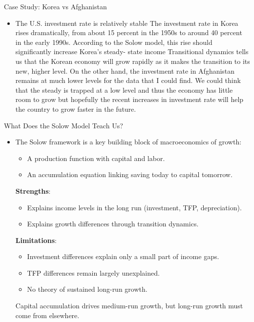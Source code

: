 \documentclass[10pt,aspectratio=169]{beamer}
\begin{document}
\begin{frame}{Case Study: Korea vs Afghanistan}
\begin{itemize}
\item  The U.S. investment rate is relatively stable
\itemvso The investment rate in Korea rises dramatically, from about 15 percent in the 1950s to around 40 percent in
the early 1990s.
\itemvso According to the Solow model, this rise should significantly increase
Korea’s steady- state income
\itemvso Transitional dynamics tells us that
the Korean economy will grow rapidly as it makes the transition to its new, higher
level.
\itemvso On the other hand, the investment rate in Afghanistan remains at much lower levels for the data that I could find.
\itemvso We could think that the steady is trapped at a low level and thus the economy has little room to grow but hopefully the recent increases in investment rate will help the country to grow faster in the future.
\end{itemize}
\end{frame}
\begin{frame}{What Does the Solow Model Teach Us?}
\begin{itemize}
\item The Solow framework is a key building block of macroeconomics of growth:
\begin{itemize}
    \item A production function with capital and labor.
    \item An accumulation equation linking saving today to capital tomorrow.
\end{itemize}
\itemvso \textbf{Strengths}:
\begin{itemize}
    \item Explains income levels in the long run (investment, TFP, depreciation).
    \item Explains growth differences through transition dynamics.
\end{itemize}
\itemvso \textbf{Limitations}:
\begin{itemize}
    \item Investment differences explain only a small part of income gaps.
    \item TFP differences remain largely unexplained.
    \item No theory of sustained long-run growth.
\end{itemize}
\itemvso Capital accumulation drives medium-run growth, but long-run growth must come from elsewhere.
\end{itemize}
\end{frame}
\end{document}
